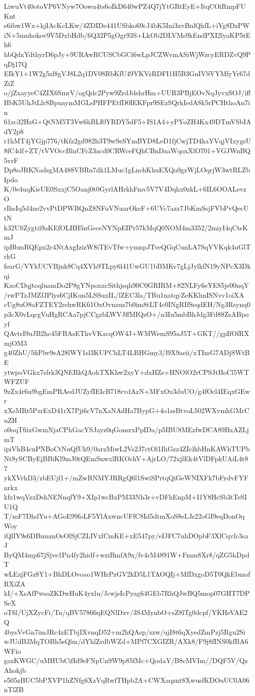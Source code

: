 LiwuVt40otoVP6VNyw7Oowu4ts6oIkD640wPZ4Q7jYtGRtEyE+ItqCOiRmpFUKnt
e6ibw1Wx+kjIAcKcLKw/4ZDIDe441USbko69cJ4bK5Ini3xvBnlQhfL+iYg8DzPW
iN+5muhokov9V5DxbHdb/6Q32P5gOgr93S+LkOb2DLVMs9kEndPXI2lyaKP5tEh6
hbQdxYdthyrD6pJy+9URAwRCUSCbGCi6wLpJCZWvmASiWjWzcyERDZvQ9PqDj17Q
EIkY1+1W2g5zl8gVJ8L2q1DV08RbKfU49YKVzRDFI1H5B3GnIVSVYMfyYr67dZiZ
o/jZxayyeC4ZIX6SmrV/ogQdc2Pyw9ZrdJdshrHm+UUR3PBjEOvNqJyvxSOJ/iff
HbK5UhJtLlr8BpuaymMGLsPHFPEtfD0IEKFpr9SEzSQrkIedA8k5rPCHthoAn7in
61zc32HzG+QtNM5T3Vw6hBLI0YRDY5dF5+IS1A4+yPYoZH4Kx49DTmVSbIAdY2p8
r1hMT4jYGjp776/tKfz2gd982h3T9wSeSYmBYD8LeD1fjCwjTD4kaYVqjVIxygsU
8fC4df+ZT/tVVOccBlnCFcZ3acd0CRWceFQhCBnDzaWqoxXlO701+VGJWnBQ5vrF
Dp8oJRKNadsgMA488VBRu7dk1LMuc1gLnchKhuEXQa0gzWjLOqrjW3wtRLZbIpdo
K/0e4uqKieUE0SxxjC5Oanj0t0GyrlAHrkhFmv5V7V4Dqhx0zkL+6IL6OOALevzO
rIhsIq5d4ne2vvPtDPWBQnZ8NFuVNuarOkeF+6UVc7azz7JbKmSsjFVbPvQecUtN
k32USZygtii9aKEfOLHH5nGeceNYNpEIPr57kMqQ0NOM4m3352/2miyI4qCtsKmJ
ipBbmRQEpx2c4NtAxgIzizW8iTEvTfw+ymnpJTveQGqCunLA7SqVVKqk4uGlTrkG
fearG/VYkUCVBjnk8Cq4XVh9TLpy6l41UwGU1bBMKv7gLjJylkfN19yNPcX3Dkqi
KzoCDqjtoqluamDo2P8gYNpoxxcSithjsqh90C0GRIRM+82NLFy6eYE85je00nqY
/rwPTzJMZfJPlys6CjIKun5LSSuxIL/lZEC3la/TRu1natqyZeKKhnISNvv1oiXA
cUg8uO8aFZTEY2rehwRK61OxOvnzuz7b0im8tLT4c0INgRIfSsqdEH/Ng3Rsynq0
p3cX0vLqcgVuHgRCAa7pjCCgzbLWVJffMIQzO+/n3Iu5mbBhJdg3Fd88ZsABpoyf
QAvtrI9uJB2hc45FBAsEThvVKacqOW4J+WMWemS95aJ5T+GKT//gpIfOfRXmjOM3
g40ZhU/5fiPlw9eA28lWY1sl3KUPChLT4LBHGmy3/l9X9aeii/xTImG7ADjSWtBE
ytwpoVGkx7sfrk3QNERkQAohTXKhw2xyY+dxHZs+HNOlO2rCPSJtHoCl5WTWFZUF
9zZx4r6u9bgEmPRAedJUZyfIEIcB718rvdAzN+MFxOx3duUO/g4fOcl4IEqxGEwr
xXsMRt5PzrExD41rX7Pji6cV7nXaNAdHa7BypG+4o1ssBtvoL502WXvmhGMrCuZH
o0oqT6ixGwmNjaCPhGacYSJayz0qGonsrxPpIDa/p5IBU8MEzfwDCA89BxAZLjmT
ipiVhB4cnPNBoCtNuQfUh9/0arzMiwL2Vs2J7ctOl1IhGzz4ZIclhbHnKAWhTUPb
Nt8ySCByEjBBiKl9mJ0tQEmSnwxlRKOchV+AjrLO/72xjlEk4tVlDFpkUAiL4t87
ykXVrhD3/zbEUjf1+/mZwRNMYJRRgQ6l1SwiSPrtqQiGeWNIXFk7bFydvFYFnrkx
kfz1wqVzxDshNENnqfY9+XIp1wcBxPM33Nh3r+vDFhEnpM+I1Y8HcSb3tTeSIU1Q
T/mF7DhdYu+AGoE99foLF5YlAxwncUFfC8Id5dtmXoS8eLJs22oGI9eqDonOqWoy
iQlIY9s6DBummOsOlSjCZLIVxlCmKE+xE547py/eIJFC7uhDOpbF3XlCqvfc3saJ
ByQM4mp67jSjve1Pn4fy2hidf+wziBmfA9x/fv4rM4891W+Fmm8Xr8/qZG5hDpdT
wLEzjFGz8Y1+BhDLOvoao1WHrPzGV2kD5L1TAOQIj+MfDxgoD5T0QkEbmofRXiZA
kI/+XsAfPwsoZKDwHuK4yxlu/JcwjsIcPyag64GEb7RhQJwBQ5mop07GHT7DPSeX
oT6l/UjXZycFi/Tn/qBV57866qEQNlDxv/3S4MynbO+sZ8lTg0dcpf/YKHeVAE2Q
4bysVvGn7imJRc4zETbjIXvnqD52+m2hQAsp/zzw/ujI8t6qXyedZmPzj5Rgu2Si
wJUdB3MqTOBh5sQlm/dYhlZrdbWZd+MPf7CXGIZR/AXk8/F9j8fINS0kfBA6WFio
gazKWGC/uMHUbCifId9eFNpUn9W9p85fMc+QodaY/B8cMVIm//DQF5V/QzAhokjb
e505zBUC5bPXVP1hZNfg6XzVqRwfTHpb2A+CWXaqznt8XwusfKDOuUC0A06nTlZB
